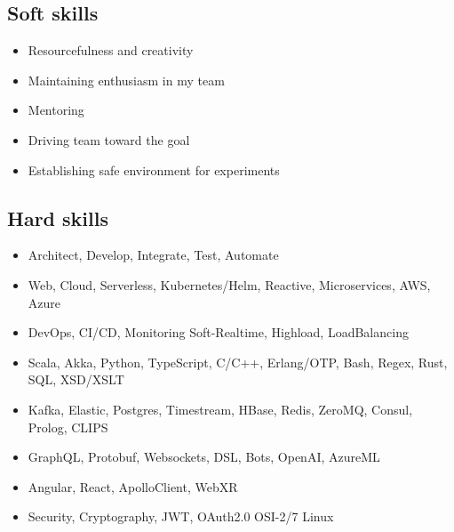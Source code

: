 
\subsection*{Soft skills}

\begin{itemize}[noitemsep, nosep]
  \item Resourcefulness and creativity
  \item Maintaining enthusiasm in my team
  \item Mentoring
  \item Driving team toward the goal
  \item Establishing safe environment for experiments
\end{itemize}

\subsection*{Hard skills}

\begin{itemize}[noitemsep, nosep]
  \item Architect, Develop, Integrate, Test, Automate
  \item Web, Cloud, Serverless, Kubernetes/Helm, Reactive, Microservices, AWS, Azure
  \item DevOps, CI/CD, Monitoring \textbar{} Soft-Realtime, Highload, LoadBalancing
  \item Scala, Akka, Python, TypeScript, C/C++, Erlang/OTP, Bash, Regex, Rust, SQL, XSD/XSLT
  \item Kafka, Elastic, Postgres, Timestream, HBase, Redis, ZeroMQ, Consul, Prolog, CLIPS
  \item GraphQL, Protobuf, Websockets, DSL, Bots, OpenAI, AzureML
  \item Angular, React, ApolloClient, WebXR
  \item Security, Cryptography, JWT, OAuth2.0 \textbar{} OSI-2/7 \textbar{} Linux
\end{itemize}